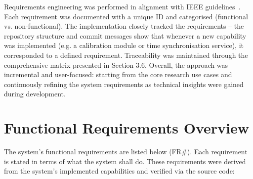 Requirements engineering was performed in alignment with IEEE guidelines~\cite{selye1974stress}. Each requirement was documented with a unique ID and categorised (functional vs. non-functional). The implementation closely tracked the requirements -- the repository structure and commit messages show that whenever a new capability was implemented (e.g. a calibration module or time synchronisation service), it corresponded to a defined requirement. Traceability was maintained through the comprehensive matrix presented in Section 3.6. Overall, the approach was incremental and user-focused: starting from the core research use cases and continuously refining the system requirements as technical insights were gained during development.

\section{Functional Requirements Overview}

The system's functional requirements are listed below (FR\#). Each requirement is stated in terms of what the system shall do. These requirements were derived from the system's implemented capabilities and verified via the source code:


